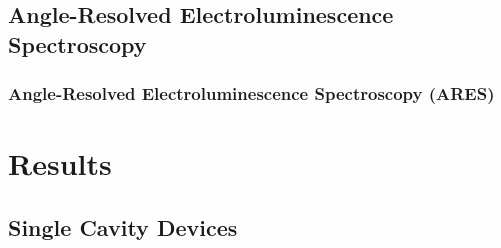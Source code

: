 \documentclass{beamer}
\begin{document}
    \subsection{Angle-Resolved Electroluminescence Spectroscopy}
		\begin{frame}
			\frametitle{Angle-Resolved Electroluminescence Spectroscopy (ARES)}
		\end{frame}
    
\section{Results}
    \frame{\tableofcontents[currentsection]}
    
    \subsection{Single Cavity Devices}
        
\end{document}
